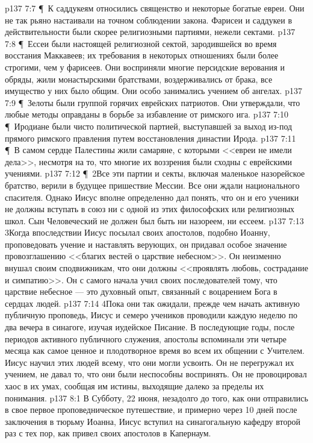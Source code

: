 \vs p137 7:7 \P\ К саддукеям относились священство и некоторые богатые евреи. Они не так рьяно настаивали на точном соблюдении закона. Фарисеи и саддукеи в действительности были скорее религиозными партиями, нежели сектами.
\vs p137 7:8 \P\ Ессеи были настоящей религиозной сектой, зародившейся во время восстания Маккавеев; их требования в некоторых отношениях были более строгими, чем у фарисеев. Они восприняли многие персидские верования и обряды, жили монастырскими братствами, воздерживались от брака, все имущество у них было общим. Они особо занимались учением об ангелах.
\vs p137 7:9 \P\ Зелоты были группой горячих еврейских патриотов. Они утверждали, что любые методы оправданы в борьбе за избавление от римского ига.
\vs p137 7:10 \P\ Иродиане были чисто политической партией, выступавшей за выход из\hyp{}под прямого римского правления путем восстановления династии Ирода.
\vs p137 7:11 \P\ В самом сердце Палестины жили самаряне, с которыми <<евреи не имели дела>>, несмотря на то, что многие их воззрения были сходны с еврейскими учениями.
\vs p137 7:12 \P\ 2Все эти партии и секты, включая маленькое назорейское братство, верили в будущее пришествие Мессии. Все они ждали национального спасителя. Однако Иисус вполне определенно дал понять, что он и его ученики не должны вступать в союз ни с одной из этих философских или религиозных школ. Сын Человеческий не должен был быть ни назореем, ни ессеем.
\vs p137 7:13 3Когда впоследствии Иисус посылал своих апостолов, подобно Иоанну, проповедовать учение и наставлять верующих, он придавал особое значение провозглашению <<благих вестей о царствие небесном>>. Он неизменно внушал своим сподвижникам, что они должны <<проявлять любовь, сострадание и симпатию>>. Он с самого начала учил своих последователей тому, что царствие небесное --- это духовный опыт, связанный с воцарением Бога в сердцах людей.
\vs p137 7:14 4Пока они так ожидали, прежде чем начать активную публичную проповедь, Иисус и семеро учеников проводили каждую неделю по два вечера в синагоге, изучая иудейское Писание. В последующие годы, после периодов активного публичного служения, апостолы вспоминали эти четыре месяца как самое ценное и плодотворное время во всем их общении с Учителем. Иисус научил этих людей всему, что они могли усвоить. Он не перегружал их учением, не давал то, что они были неспособны воспринять. Он не провоцировал хаос в их умах, сообщая им истины, выходящие далеко за пределы их понимания.
\vs p137 8:1 В Субботу, 22 июня, незадолго до того, как они отправились в свое первое проповедническое путешествие, и примерно через 10 дней после заключения в тюрьму Иоанна, Иисус вступил на синагогальную кафедру второй раз с тех пор, как привел своих апостолов в Капернаум.
